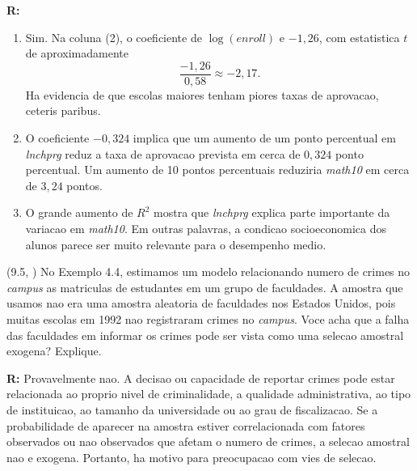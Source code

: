 \documentclass[12pt,letterpaper, onecolumn]{exam}
\renewenvironment{solution}
{\par\noindent\textbf{R:}\enspace\color{blue}}
{\par\color{black}}
\begin{document}
\begin{questions}
\begin{solution}
\begin{enumerate}[label=(\roman*)]
    \item Sim. Na coluna (2), o coeficiente de \(\log(enroll)\) e \(-1,26\), com estatistica \(t\) de aproximadamente
    \[
    \frac{-1,26}{0,58}\approx -2,17.
    \]
    Ha evidencia de que escolas maiores tenham piores taxas de aprovacao, ceteris paribus.

    \item O coeficiente \(-0,324\) implica que um aumento de um ponto percentual em \textit{lnchprg} reduz a taxa de aprovacao prevista em cerca de \(0,324\) ponto percentual. Um aumento de 10 pontos percentuais reduziria \textit{math10} em cerca de \(3,24\) pontos.

    \item O grande aumento de \(R^2\) mostra que \textit{lnchprg} explica parte importante da variacao em \textit{math10}. Em outras palavras, a condicao socioeconomica dos alunos parece ser muito relevante para o desempenho medio.
\end{enumerate}
\end{solution}

\vspace{0.7cm}

\question (9.5, \citep{wooldridge2016}) No Exemplo 4.4, estimamos um modelo relacionando numero de crimes no \textit{campus} as matriculas de estudantes em um grupo de faculdades. A amostra que usamos nao era uma amostra aleatoria de faculdades nos Estados Unidos, pois muitas escolas em 1992 nao registraram crimes no \textit{campus}. Voce acha que a falha das faculdades em informar os crimes pode ser vista como uma selecao amostral exogena? Explique.

\begin{solution}
Provavelmente nao. A decisao ou capacidade de reportar crimes pode estar relacionada ao proprio nivel de criminalidade, a qualidade administrativa, ao tipo de instituicao, ao tamanho da universidade ou ao grau de fiscalizacao. Se a probabilidade de aparecer na amostra estiver correlacionada com fatores observados ou nao observados que afetam o numero de crimes, a selecao amostral nao e exogena. Portanto, ha motivo para preocupacao com vies de selecao.
\end{solution}

\vspace{0.7cm}


\end{questions}
\end{document}
